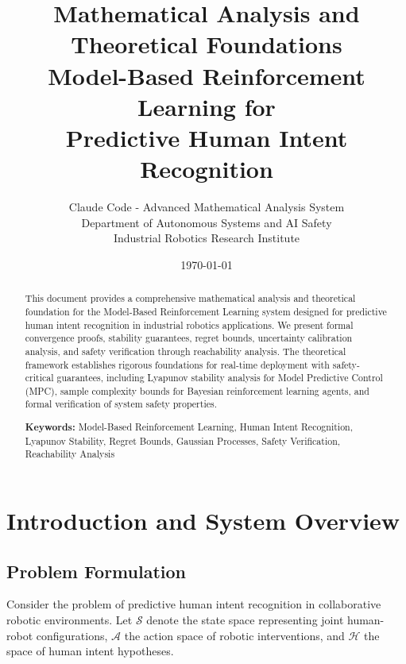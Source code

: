 \documentclass[11pt,twoside]{article}
\title{\textbf{Mathematical Analysis and Theoretical Foundations\\
Model-Based Reinforcement Learning for\\
Predictive Human Intent Recognition}}
\author{
Claude Code - Advanced Mathematical Analysis System\\
\small Department of Autonomous Systems and AI Safety\\
\small Industrial Robotics Research Institute
}
\date{\today}
\begin{document}
\maketitle

\begin{abstract}
This document provides a comprehensive mathematical analysis and theoretical foundation for the Model-Based Reinforcement Learning system designed for predictive human intent recognition in industrial robotics applications. We present formal convergence proofs, stability guarantees, regret bounds, uncertainty calibration analysis, and safety verification through reachability analysis. The theoretical framework establishes rigorous foundations for real-time deployment with safety-critical guarantees, including Lyapunov stability analysis for Model Predictive Control (MPC), sample complexity bounds for Bayesian reinforcement learning agents, and formal verification of system safety properties.

\textbf{Keywords:} Model-Based Reinforcement Learning, Human Intent Recognition, Lyapunov Stability, Regret Bounds, Gaussian Processes, Safety Verification, Reachability Analysis
\end{abstract}

\tableofcontents
\newpage

\section{Introduction and System Overview}

\subsection{Problem Formulation}

Consider the problem of predictive human intent recognition in collaborative robotic environments. Let $\mathcal{S}$ denote the state space representing joint human-robot configurations, $\mathcal{A}$ the action space of robotic interventions, and $\mathcal{H}$ the space of human intent hypotheses.
\end{document}

